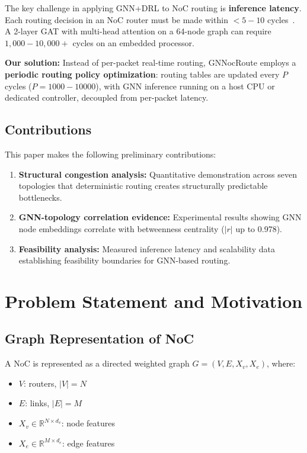 \documentclass[conference]{IEEEtran}
\begin{document}
The key challenge in applying GNN+DRL to NoC routing is \textbf{inference latency}. Each routing decision in an NoC router must be made within $<5-10$ cycles~\cite{wang2022maar}. A 2-layer GAT with multi-head attention on a 64-node graph can require $1{,}000-10{,}000+$ cycles on an embedded processor.

\textbf{Our solution:} Instead of per-packet real-time routing, GNNocRoute employs a \textbf{periodic routing policy optimization}: routing tables are updated every $P$ cycles ($P=1000{-}10000$), with GNN inference running on a host CPU or dedicated controller, decoupled from per-packet latency.

\subsection{Contributions}
\label{sec:contributions}

This paper makes the following preliminary contributions:
\begin{enumerate}
    \item \textbf{Structural congestion analysis:} Quantitative demonstration across seven topologies that deterministic routing creates structurally predictable bottlenecks.
    \item \textbf{GNN-topology correlation evidence:} Experimental results showing GNN node embeddings correlate with betweenness centrality ($|r|$ up to 0.978).
    \item \textbf{Feasibility analysis:} Measured inference latency and scalability data establishing feasibility boundaries for GNN-based routing.
\end{enumerate}


\section{Problem Statement and Motivation}
\label{sec:problem}

\subsection{Graph Representation of NoC}

A NoC is represented as a directed weighted graph $G=(V,E,X_v,X_e)$, where:
\begin{itemize}
 \item $V$: routers, $|V|=N$
 \item $E$: links, $|E|=M$
 \item $X_v\in\mathbb{R}^{N\times d_v}$: node features
 \item $X_e\in\mathbb{R}^{M\times d_e}$: edge features
\end{itemize}
\end{document}
